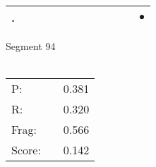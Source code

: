 \documentclass[landscape]{article}
\newcommand{\ssp}{\hspace{2pt}}
\newcommand{\mex}{\cellcolor{g}$\bullet$}
\begin{document}
\begin{tabular}{|l|p{10pt}|p{10pt}|p{10pt}|p{10pt}|p{10pt}|p{10pt}|p{10pt}|p{10pt}|p{10pt}|p{10pt}|p{10pt}|}
\hline
\ssp \cellcolor{ref10}. \ssp&\hspace{2pt}&\hspace{2pt}&\hspace{2pt}&\hspace{2pt}&\hspace{2pt}&\hspace{2pt}&\hspace{2pt}&\hspace{2pt}&\hspace{2pt}&\hspace{2pt}&\hspace{2pt}\mex\\
\hline
\end{tabular}

\vspace{6pt}
\noindent Segment 94\\\\
\noindent\begin{tabular}{lm{12pt}r}
\hline
P:&&0.381\\
R:&&0.320\\
Frag:&&0.566\\
Score:&&0.142\\
\end{tabular}

\newpage
\end{document}
